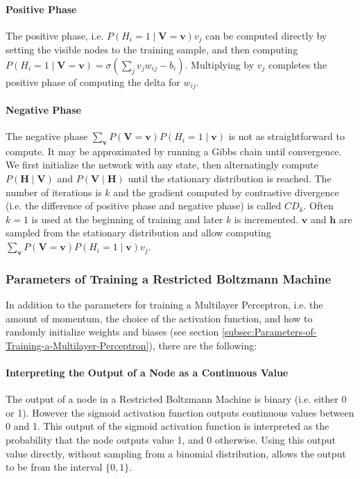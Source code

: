 \paragraph{Positive Phase}

The positive phase, i.e. $P(H_{i}=1\mid\mathbf{V=v})v_{j}$ can be
computed directly by setting the visible nodes to the training sample,
and then computing $P(H_{i}=1\mid\mathbf{V=v})=\sigma\left(\sum_{j}v_{j}w_{ij}-b_{i}\right)$.
Multiplying by $v_{j}$ completes the positive phase of computing
the delta for $w_{ij}$.

\paragraph{Negative Phase}

The negative phase $\sum_{\mathbf{v}}P(\mathbf{V=v})P(H_{i}=1\mid\mathbf{v})$
is not as straightforward to compute. It may be approximated by running
a Gibbs chain until convergence. We first initialize the network with
any state, then alternatingly compute $P(\mathbf{H}\mid\mathbf{V})$
and $P(\mathbf{V}\mid\mathbf{H})$ until the stationary distribution
is reached. The number of iterations is $k$ and the gradient computed
by contrastive divergence (i.e. the
difference of positive phase and negative phase) is called $CD_{k}$.
Often $k=1$ is used at the beginning of training and later $k$ is
incremented. $\mathbf{v}$ and $\mathbf{h}$ are sampled from the
stationary distribution and allow computing $\sum_{\mathbf{v}}P(\mathbf{V=v})P(H_{i}=1\mid\mathbf{v})v_{j}$.


\subsubsection{Parameters of Training a Restricted Boltzmann Machine}

In addition to the parameters for training a Multilayer Perceptron,
i.e. the amount of momentum, the choice of the activation function,
and how to randomly initialize weights and biases (see section \ref{subsec:Parameters-of-Training-a-Multilayer-Perceptron}),
there are the following:

\paragraph{Interpreting the Output of a Node as a Continuous Value}

The output of a node in a Restricted Boltzmann Machine is binary (i.e.
either 0 or 1). However the sigmoid activation function outputs continuous
values between 0 and 1. This output of the sigmoid activation function
is interpreted as the probability that the node outputs value 1, and
0 otherwise. Using this output value directly, without sampling from
a binomial distribution, allows the output to be from the interval
$\{0,1\}$.

